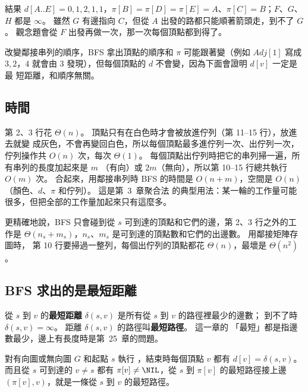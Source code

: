 結果 $d[A..E] = 0, 1, 2, 1, 1$，$\pi[B] = \pi[D] = \pi[E] = A$、$\pi[C] = B$；$F$、$G$、$H$
都是 $\infty$。 雖然 $G$ 有邊指向 $C$，但從 $A$ 出發的路都只能順著箭頭走，到不了 $G$。
觀念題會從 $F$ 出發再做一次，那一次每個頂點都到得了。

改變鄰接串列的順序，BFS 拿出頂點的順序和 $\pi$ 可能跟著變（例如 $\mathit{Adj}[1]$ 寫成
$3, 2$，$4$ 就會由 $3$ 發現），但每個頂點的 $d$ 不會變，因為下面會證明 $d[v]$ 一定是最
短距離，和順序無關。

\subsection{時間}

第 2、3 行花 $\Theta(n)$。 頂點只有在白色時才會被放進佇列（第 11--15 行），放進去就變
成灰色，不會再變回白色，所以每個頂點最多進佇列一次、出佇列一次，佇列操作共 $O(n)$
次，每次 $\Theta(1)$。 每個頂點出佇列時把它的串列掃一遍，所有串列的長度加起來是 $m$
（有向）或 $2m$（無向），所以第 10--15 行總共執行 $O(m)$ 次。 合起來，用鄰接串列時
BFS 的時間是 $O(n + m)$，空間是 $O(n)$（顏色、$d$、$\pi$ 和佇列）。 這是第~3~章聚合法
的典型用法：某一輪的工作量可能很多，但把全部的工作量加起來只有這麼多。

更精確地說，BFS 只會碰到從 $s$ 可到達的頂點和它們的邊，第 2、3 行之外的工作是
$\Theta(n_s + m_s)$，$n_s$、$m_s$ 是可到達的頂點數和它們的出邊數。 用鄰接矩陣存圖時，
第 10 行要掃過一整列，每個出佇列的頂點都花 $\Theta(n)$，最壞是 $\Theta(n^2)$。

\subsection{BFS 求出的是最短距離}
\label{sec:gtr-bfs-proof}

從 $s$ 到 $v$ 的\textbf{最短距離} $\delta(s, v)$ 是所有從 $s$ 到 $v$ 的路徑裡最少的邊數；
到不了時 $\delta(s, v) = \infty$。 距離 $\delta(s, v)$ 的路徑叫\textbf{最短路徑}。 這一章的
「最短」都是指邊數最少，邊上有長度時是第~25~章的問題。

\begin{theorem}
\label{thm:gtr-bfs}
對有向圖或無向圖 $G$ 和起點 $s$ 執行 ，結束時每個頂點 $v$ 都有
$d[v] = \delta(s, v)$。 而且從 $s$ 可到達的 $v \ne s$ 都有 $\pi[v] \ne \NIL$，從 $s$ 到
$\pi[v]$ 的最短路徑接上邊 $(\pi[v], v)$，就是一條從 $s$ 到 $v$ 的最短路徑。
\end{theorem}

